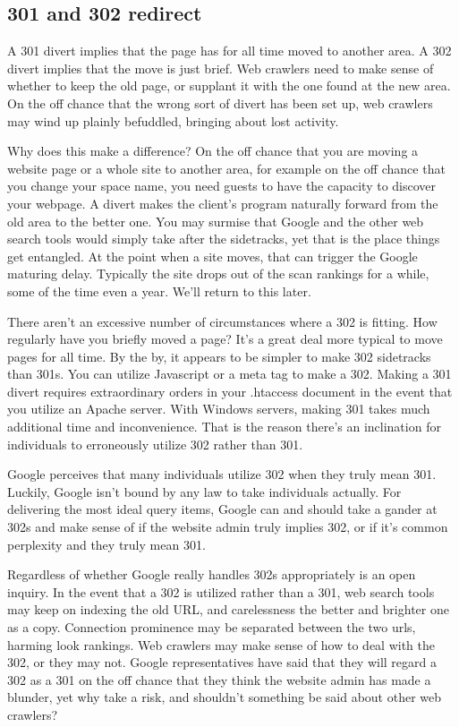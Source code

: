 \appendix
\begin{appendices}
\chapter{301 and 302 redirect}
\label{redirect}
A 301 divert implies that the page has for all time moved to another area. A 302 divert implies that the move is just brief. Web crawlers need to make sense of whether to keep the old page, or supplant it with the one found at the new area. On the off chance that the wrong sort of divert has been set up, web crawlers may wind up plainly befuddled, bringing about lost activity. 

Why does this make a difference? On the off chance that you are moving a website page or a whole site to another area, for example on the off chance that you change your space name, you need guests to have the capacity to discover your webpage. A divert makes the client's program naturally forward from the old area to the better one. You may surmise that Google and the other web search tools would simply take after the sidetracks, yet that is the place things get entangled. At the point when a site moves, that can trigger the Google maturing delay. Typically the site drops out of the scan rankings for a while, some of the time even a year. We'll return to this later. 

There aren't an excessive number of circumstances where a 302 is fitting. How regularly have you briefly moved a page? It's a great deal more typical to move pages for all time. By the by, it appears to be simpler to make 302 sidetracks than 301s. You can utilize Javascript or a meta tag to make a 302. Making a 301 divert requires extraordinary orders in your .htaccess document in the event that you utilize an Apache server. With Windows servers, making 301 takes much additional time and inconvenience. That is the reason there's an inclination for individuals to erroneously utilize 302 rather than 301. 

Google perceives that many individuals utilize 302 when they truly mean 301. Luckily, Google isn't bound by any law to take individuals actually. For delivering the most ideal query items, Google can and should take a gander at 302s and make sense of if the website admin truly implies 302, or if it's common perplexity and they truly mean 301. 

Regardless of whether Google really handles 302s appropriately is an open inquiry. In the event that a 302 is utilized rather than a 301, web search tools may keep on indexing the old URL, and carelessness the better and brighter one as a copy. Connection prominence may be separated between the two urls, harming look rankings. Web crawlers may make sense of how to deal with the 302, or they may not. Google representatives have said that they will regard a 302 as a 301 on the off chance that they think the website admin has made a blunder, yet why take a risk, and shouldn't something be said about other web crawlers? 


\end{appendices}
